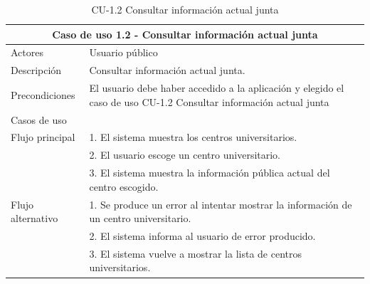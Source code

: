 \begin{table}[H]
\caption{CU-1.2 Consultar información actual junta}  \label{tab:CU-1.2}
        \begin{center}
            \begin{tabular}{|l|p{12cm}|}
                \hline
                \multicolumn{2}{|c|}{Caso de uso 1.2 - Consultar información actual junta} \\ \hline \hline
                Actores           &   Usuario público          \\  \hline
                Descripción         &   Consultar información actual junta. \\  \hline
                Precondiciones          &   El usuario debe haber accedido a la aplicación y elegido el caso de uso CU-1.2 Consultar información actual junta  \\  \hline
                Casos de uso            &          \\  \hline
                Flujo principal         &   1. El sistema muestra los centros universitarios.   \\
                &   2. El usuario escoge un centro universitario.    \\                  & 3. El sistema muestra la información pública actual del centro escogido. \\ \hline
                 Flujo alternativo    &   1. Se produce un error al intentar mostrar la información de un  centro  universitario. 
                \\  & 2. El sistema informa al usuario de error producido. 
                \\  & 3. El sistema vuelve a mostrar la lista de centros  universitarios. 
                \\
                \hline
            \end{tabular}
        \end{center}
    \end{table}

